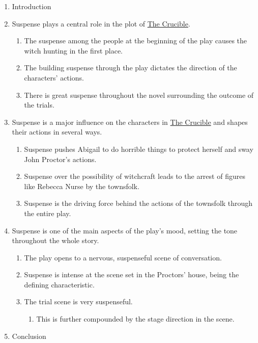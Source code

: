 \documentclass[12pt]{article}
\begin{document}
\begin{enumerate}
	\item Introduction
	\item Suspense plays a central role in the plot of \underline{The Crucible}.
		\begin{enumerate}
			\item The suspense among the people at the beginning of the play causes
				the witch hunting in the first place.
			\item The building suspense through the play dictates the direction of
				the characters' actions.
			\item There is great suspense throughout the novel surrounding the
				outcome of the trials.
		\end{enumerate}
	\item Suspense is a major influence on the characters in \underline{The 
		Crucible} and shapes their actions in several ways.
		\begin{enumerate}
			\item Suspense pushes Abigail to do horrible things to protect herself and
				sway John Proctor's actions.
			\item Suspense over the possibility of witchcraft leads to the arrest of
				figures like Rebecca Nurse by the townsfolk.
			\item Suspense is the driving force behind the actions of the townsfolk
				through the entire play.
		\end{enumerate}
	\item Suspense is one of the main aspects of the play's mood, setting the tone
		throughout the whole story.
		\begin{enumerate}
			\item The play opens to a nervous, suspenseful scene of conversation.
			\item Suspense is intense at the scene set in the Proctors' house, being
				the defining characteristic.
			\item The trial scene is very suspenseful.
				\begin{enumerate}
					\item This is further compounded by the stage direction in the scene.
				\end{enumerate}
		\end{enumerate}
	\item Conclusion
\end{enumerate}
\end{document}
